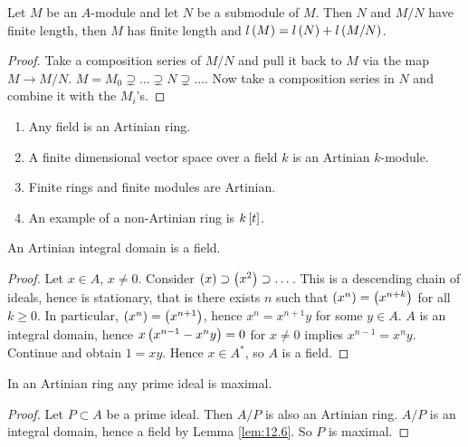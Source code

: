 \begin{proposition}
Let $ M $ be an $ A $-module and let $ N $ be a submodule of $ M $. Then $ N $ and $ M / N $ have finite length, then $ M $ has finite length and $ l\rb{M} = l\rb{N} + l\rb{M / N} $.
\end{proposition}

\begin{proof}
Take a composition series of $ M / N $ and pull it back to $ M $ via the map $ M \to M / N $. $ M = M_0 \supsetneq \dots \supsetneq N \supsetneq \dots $. Now take a composition series in $ N $ and combine it with the $ M_i $'s.
\end{proof}


\begin{example*}
\hfill
\begin{enumerate}
\item Any field is an Artinian ring.
\item A finite dimensional vector space over a field $ k $ is an Artinian $ k $-module.
\item Finite rings and finite modules are Artinian.
\item An example of a non-Artinian ring is $ k\sb{t} $.
\end{enumerate}
\end{example*}

\begin{lemma}
\label{lem:12.6}
An Artinian integral domain is a field.
\end{lemma}

\begin{proof}
Let $ x \in A $, $ x \ne 0 $. Consider $ \rb{x} \supset \rb{x^2} \supset \dots $. This is a descending chain of ideals, hence is stationary, that is there exists $ n $ such that $ \rb{x^n} = \rb{x^{n + k}} $ for all $ k \ge 0 $. In particular, $ \rb{x^n} = \rb{x^{n + 1}} $, hence $ x^n = x^{n + 1}y $ for some $ y \in A $. $ A $ is an integral domain, hence $ x\rb{x^{n - 1} - x^ny} = 0 $ for $ x \ne 0 $ implies $ x^{n - 1} = x^ny $. Continue and obtain $ 1 = xy $. Hence $ x \in A^* $, so $ A $ is a field.
\end{proof}

\begin{corollary}
\label{cor:12.7}
In an Artinian ring any prime ideal is maximal.
\end{corollary}

\begin{proof}
Let $ P \subset A $ be a prime ideal. Then $ A / P $ is also an Artinian ring. $ A / P $ is an integral domain, hence a field by Lemma \ref{lem:12.6}. So $ P $ is maximal.
\end{proof}

